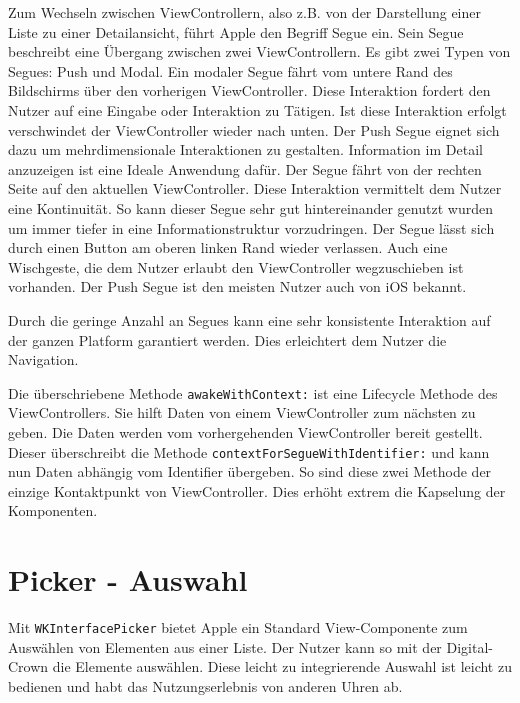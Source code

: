 Zum Wechseln zwischen ViewControllern, also z.B. von der Darstellung einer Liste zu einer Detailansicht, führt Apple den Begriff Segue ein. Sein Segue beschreibt eine Übergang zwischen zwei ViewControllern. Es gibt zwei Typen von Segues: Push und Modal. Ein modaler Segue fährt vom untere Rand des Bildschirms über den vorherigen ViewController. Diese Interaktion fordert den Nutzer auf eine Eingabe oder Interaktion zu Tätigen. Ist diese Interaktion erfolgt verschwindet der ViewController wieder nach unten. Der Push Segue eignet sich dazu um mehrdimensionale Interaktionen zu gestalten. Information im Detail anzuzeigen ist eine Ideale Anwendung dafür. Der Segue fährt von der rechten Seite auf den aktuellen ViewController. Diese Interaktion vermittelt dem Nutzer eine Kontinuität. So kann dieser Segue sehr gut hintereinander genutzt wurden um immer tiefer in eine Informationstruktur vorzudringen. Der Segue lässt sich durch einen Button am oberen linken Rand wieder verlassen. Auch eine Wischgeste, die dem Nutzer erlaubt den ViewController wegzuschieben ist vorhanden. Der Push Segue ist den meisten Nutzer auch von iOS bekannt.

Durch die geringe Anzahl an Segues kann eine sehr konsistente Interaktion auf der ganzen Platform garantiert werden. Dies erleichtert dem Nutzer die Navigation.

Die überschriebene Methode \lstinline{awakeWithContext:} ist eine Lifecycle Methode des ViewControllers. Sie hilft Daten von einem ViewController zum nächsten zu geben. Die Daten werden vom vorhergehenden ViewController bereit gestellt. Dieser überschreibt die Methode \lstinline{contextForSegueWithIdentifier:} und kann nun Daten abhängig vom Identifier übergeben. So sind diese zwei Methode der einzige Kontaktpunkt von ViewController. Dies erhöht extrem die Kapselung der Komponenten.



\section{Picker - Auswahl}
Mit \lstinline{WKInterfacePicker} bietet Apple ein Standard View-Componente zum Auswählen von Elementen aus einer Liste. Der Nutzer kann so mit der Digital-Crown die Elemente auswählen. Diese leicht zu integrierende Auswahl ist leicht zu bedienen und habt das Nutzungserlebnis von anderen Uhren ab.

